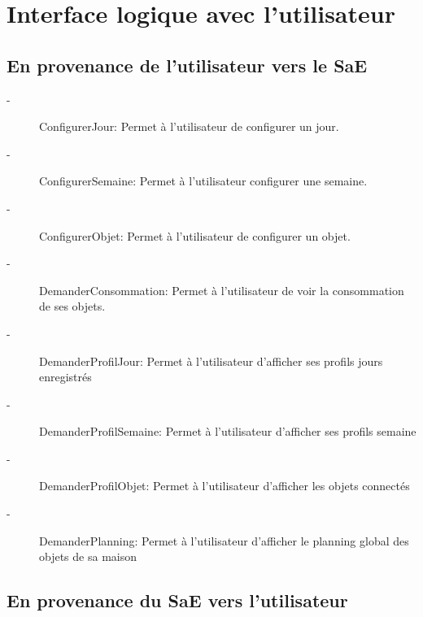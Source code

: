 \documentclass[10pt,a4paper]{report}
\begin{document}
		\section{Interface logique avec l'utilisateur}
			\subsection{En provenance de l'utilisateur vers le SaE}
			
\begin{description}
	\item[-] ConfigurerJour: Permet à l'utilisateur de configurer un jour.
	\item[-] ConfigurerSemaine: Permet à l'utilisateur configurer une semaine.
	\item[-] ConfigurerObjet: Permet à l'utilisateur de configurer un objet.
	\item[-] DemanderConsommation: Permet à l'utilisateur de voir la consommation de ses objets.
	\item[-] DemanderProfilJour: Permet à l'utilisateur d'afficher ses profils jours enregistrés
	\item[-] DemanderProfilSemaine: Permet à l'utilisateur d'afficher ses profils semaine 
	\item[-] DemanderProfilObjet: Permet à l'utilisateur d'afficher les objets connectés 
	\item[-] DemanderPlanning: Permet à l'utilisateur d'afficher le planning global des objets de sa maison
	
	
\end{description}
			
			\subsection{En provenance du SaE vers l'utilisateur}
			
\end{document}
